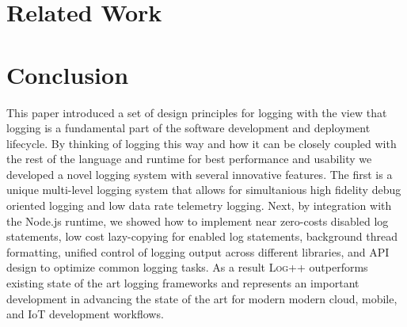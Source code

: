 \documentclass[sigplan,10pt,review]{acmart}
\newcommand{\projn}{\textsc{Log++}\xspace}
\begin{document}
\section{Related Work}
\label{sec:relwork}

\section{Conclusion}
This paper introduced a set of design principles for logging with the view that 
logging is a fundamental part of the software development and deployment lifecycle. 
By thinking of logging this way and how it can be closely coupled with the rest of the 
language and runtime for best performance and usability we developed a novel logging 
system with several innovative features. The first is a unique multi-level logging 
system that allows for simultanious high fidelity debug oriented logging and low data 
rate telemetry logging. Next, by integration with the Node.js runtime, we showed how 
to implement near zero-costs disabled log statements, low cost lazy-copying 
for enabled log statements, background thread formatting, unified control 
of logging output across different libraries, and API design to optimize common logging 
tasks. As a result \projn outperforms existing state of the art logging frameworks and 
represents an important development in advancing the state of the art for 
modern modern cloud, mobile, and IoT development workflows.

\balance

{
\raggedright 

 
}
\end{document}
